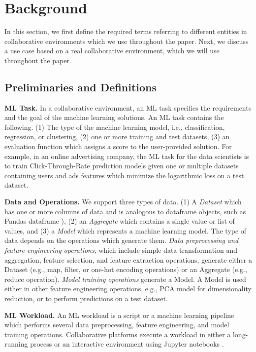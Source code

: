 \section{Background} \label{sec-background}
In this section, we first define the required terms referring to different entities in collaborative environments which we use throughout the paper.
Next, we discuss a use case based on a real collaborative environment, which we will use throughout the paper.

\subsection{Preliminaries and Definitions}
\textbf{ML Task.} 
In a collaborative environment, an ML task specifies the requirements and the goal of the machine learning solutions.
An ML task contains the following.
(1) The type of the machine learning model, i.e., classification, regression, or clustering, (2) one or more training and test datasets, (3) an evaluation function which assigns a score to the user-provided solution.
For example, in an online advertising company, the ML task for the data scientists is to train Click-Through-Rate prediction models given one or multiple datasets containing users and ads features which minimize the logarithmic loss on a test dataset.

\textbf{Data and Operations.}
We support three types of data.
(1) A \textit{Dataset} which has one or more columns of data and is analogous to dataframe objects, such as Pandas dataframe \cite{mckinney-proc-scipy-2010}), (2) an \textit{Aggregate} which contains a single value or list of values, and (3) a \textit{Model} which represents a machine learning model.
The type of data depends on the operations which generate them.
\textit{Data preprocessing and feature engineering operations}, which include simple data transformation and aggregation, feature selection, and feature extraction operations, generate either a Dataset (e.g., map, filter, or one-hot encoding operations)  or an Aggregate (e.g., reduce operation).
\textit{Model training operations} generate a Model.
A Model is used either in other feature engineering operations, e.g., PCA model for dimensionality reduction, or to perform predictions on a test dataset.
 
\textbf{ML Workload.}
An ML workload is a script or a machine learning pipeline which performs several data preprocessing, feature engineering, and model training operations. 
Collaborative platforms execute a workload in either a long-running process or an interactive environment using Jupyter notebooks \cite{Kluyver:2016aa}.

